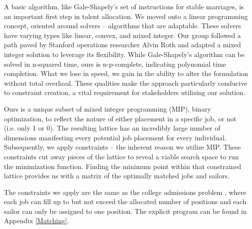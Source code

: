 A basic algorithm, like Gale-Shapely’s set of instructions for stable marriages, is an important first step in talent allocation. We moved onto a linear programming concept, oriented around solvers -- algorithms that are adaptable.  These solvers have varying types like linear, convex, and mixed integer.  Our group followed a path paved by Stanford operations researcher Alvin Roth and adapted a mixed integer solution to leverage its flexibility.  While Gale-Shapely’s algorithm can be solved in n-squared time, ours is n-p-complete, indicating polynomial time completion. What we lose in speed, we gain in the ability to alter the formulation without total overhaul.  These qualities make the approach particularly conducive to constraint creation, a vital requirement for stakeholders utilizing our solution.  

Ours is a unique subset of mixed integer programming (MIP), binary optimization, to reflect the nature of either placement in a specific job, or not (i.e. only 1 or 0). The resulting lattice has an incredibly large number of dimensions manifesting every potential job placement for every individual.  Subsequently, we apply constraints -- the inherent reason we utilize MIP.  These constraints cut away pieces of the lattice to reveal a viable search space to run the minimization function.  Finding the minimum point within that constrained lattice provides us with a matrix of the optimally matched jobs and sailors.

The constraints we apply are the same as the college admissions problem \cite{1985_Roth}, where each job can fill up to but not exceed the allocated number of positions and each sailor can only be assigned to one position. The explicit program can be found in Appendix \ref{Matching}. 